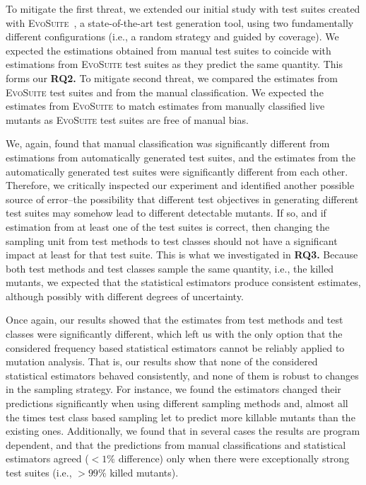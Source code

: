 \documentclass[sigconf,review,anonymous]{acmart}
\newcommand{\Evosuite}{\textsc{EvoSuite}\xspace}
\begin{document}
To mitigate the first threat, we extended our initial study with test suites created with
\Evosuite~\cite{fraser2011evosuite}, a state-of-the-art test generation tool,
using two fundamentally different configurations (i.e., a random strategy and guided by coverage).
We expected the estimations obtained from manual test suites
to coincide with estimations from \Evosuite test suites
as they predict the same quantity.
This forms our \textbf{RQ2.}
%
To mitigate second threat, we compared the estimates from \Evosuite
test suites and from the manual classification. We expected
the estimates from \Evosuite to match estimates from manually classified live
mutants as \Evosuite test suites are free of manual bias. %

We, again, found that manual classification was significantly different from
estimations from automatically generated test suites, and the estimates from the automatically
generated test suites %
were significantly different from each other.
Therefore, we critically inspected our experiment and identified another
possible source of error--the possibility that different test objectives
in generating different test suites may somehow lead to different
detectable mutants. If so, and if estimation from at least one of the test
suites is correct, then changing the sampling unit from test methods to test
classes should not have a significant impact at least for that test suite.
This is what we investigated in \textbf{RQ3.}
Because both test methods and test classes sample the same quantity, i.e., the killed mutants,
we expected that the statistical estimators produce consistent estimates, although
possibly with different degrees of uncertainty.

Once again, our results showed that the estimates from test methods and test classes were
significantly different, which left us with the only option that the considered frequency based statistical
estimators cannot be reliably applied to mutation analysis.
%
That is, our results show that none of the considered statistical estimators
behaved consistently, and none of them is %
robust to changes in the sampling strategy.
For instance, we found the estimators changed their predictions significantly
when using different sampling methods and, almost all the times %
test class based sampling let to predict more killable mutants than the existing ones.
%
Additionally, we found that in several cases the results are program dependent,
and that the predictions from manual classifications and
statistical estimators agreed ($<1\%$ difference) only when there were
exceptionally strong test suites (i.e., $>99\%$ killed mutants).
\end{document}
